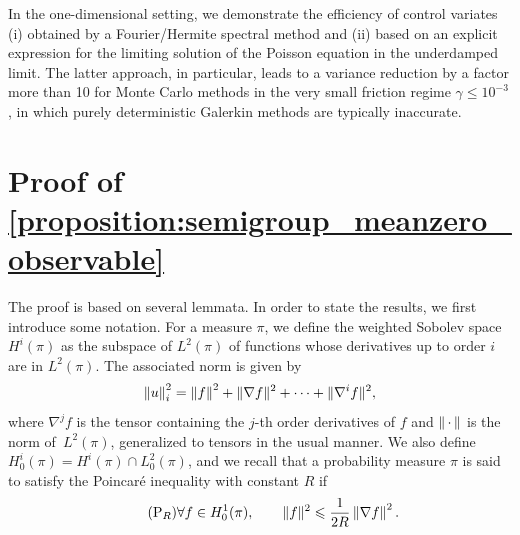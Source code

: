 \documentclass[11pt,a4paper]{article}
\newcommand{\dummy}{\,\cdot\,}
\newcommand{\grad}{\nabla}
\theoremstyle{plain}
\numberwithin{equation}{section}
\renewcommand{\leq}{\leqslant}
\begin{document}
In the one-dimensional setting,
we demonstrate the efficiency of control variates
(i) obtained by a Fourier/Hermite spectral method and
(ii) based on an explicit expression for the limiting solution of the Poisson equation in the underdamped limit.
The latter approach, in particular,
leads to a variance reduction by a factor more than 10 for Monte Carlo methods in the very small friction regime $\gamma \leq 10^{-3}$,
in which purely deterministic Galerkin methods are typically inaccurate.

\appendix
\section{Proof of \texorpdfstring{\cref{proposition:semigroup_meanzero_observable}}{Proposition 2.1}}%
\label{sec:auxiliary_technical_results}

The proof is based on several lemmata.
In order to state the results, we first introduce some notation.
For a measure $\pi$, we define the weighted Sobolev space $H^i(\pi)$ as the subspace of $L^2(\pi)$
of functions whose derivatives up to order $i$ are in $L^2(\pi)$.
The associated norm is given by
\[
    \norm{u}_i^2 = \norm{f}^2 + \norm*{\nabla f}^2 + \dotsb + \norm*{\nabla^i f}^2,
\]
where  $\nabla^j f$ is the tensor containing the $j$-th order derivatives of $f$ and $\norm{\dummy}$ is the norm of~$L^2(\pi)$,
generalized to tensors in the usual manner.
We also define $H^{i}_0(\pi) = H^i(\pi) \cap L^2_0(\pi)$,
and we recall that a probability measure $\pi$ is said to satisfy the Poincaré inequality with constant $R$ if
\begin{equation}
    \label{eq:poincare}
    \tag{P$_R$}
    \forall f \in H^1_0(\pi), \qquad
    \norm*{f}^2 \leq \frac{1}{2R} \norm{\grad f}^2.
\end{equation}
\end{document}
